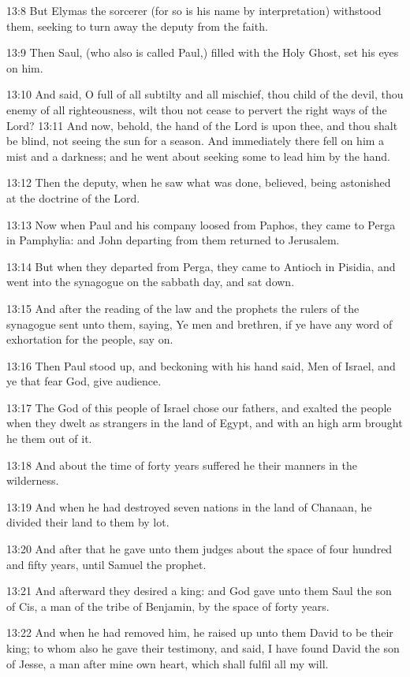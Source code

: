 13:8 But Elymas the sorcerer (for so is his name by interpretation) withstood them, seeking to turn away the deputy from the faith.

13:9 Then Saul, (who also is called Paul,) filled with the Holy Ghost, set his eyes on him.

13:10 And said, O full of all subtilty and all mischief, thou child of the devil, thou enemy of all righteousness, wilt thou not cease to pervert the right ways of the Lord?  13:11 And now, behold, the hand of the Lord is upon thee, and thou shalt be blind, not seeing the sun for a season. And immediately there fell on him a mist and a darkness; and he went about seeking some to lead him by the hand.

13:12 Then the deputy, when he saw what was done, believed, being astonished at the doctrine of the Lord.

13:13 Now when Paul and his company loosed from Paphos, they came to Perga in Pamphylia: and John departing from them returned to Jerusalem.

13:14 But when they departed from Perga, they came to Antioch in Pisidia, and went into the synagogue on the sabbath day, and sat down.

13:15 And after the reading of the law and the prophets the rulers of the synagogue sent unto them, saying, Ye men and brethren, if ye have any word of exhortation for the people, say on.

13:16 Then Paul stood up, and beckoning with his hand said, Men of Israel, and ye that fear God, give audience.

13:17 The God of this people of Israel chose our fathers, and exalted the people when they dwelt as strangers in the land of Egypt, and with an high arm brought he them out of it.

13:18 And about the time of forty years suffered he their manners in the wilderness.

13:19 And when he had destroyed seven nations in the land of Chanaan, he divided their land to them by lot.

13:20 And after that he gave unto them judges about the space of four hundred and fifty years, until Samuel the prophet.

13:21 And afterward they desired a king: and God gave unto them Saul the son of Cis, a man of the tribe of Benjamin, by the space of forty years.

13:22 And when he had removed him, he raised up unto them David to be their king; to whom also he gave their testimony, and said, I have found David the son of Jesse, a man after mine own heart, which shall fulfil all my will.

